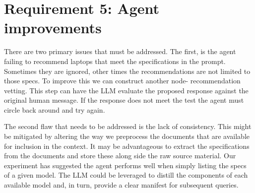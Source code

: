 \documentclass[11pt,letterpaper]{article}
\begin{document}
\section*{Requirement 5: Agent improvements}
\tab There are two primary issues that must be addressed. The first, is the agent failing to recommend laptops that meet the specifications in the prompt. Sometimes they are ignored, other times the recommendations are not limited to those specs. To improve this we can construct another node- recommendation vetting. This step can have the LLM evaluate the proposed response against the original human message. If the response does not meet the test the agent must circle back around and try again.

The second flaw that needs to be addressed is the lack of consistency. This might be mitigated by altering the way we preprocess the documents that are available for inclusion in the context. It may be advantageous to extract the specifications from the documents and store these along side the raw source material. Our experiment has suggested the agent performs well when simply listing the specs of a given model. The LLM could be leveraged to distill the components of each available model and, in turn, provide a clear manifest for subsequent queries.
\end{document}
